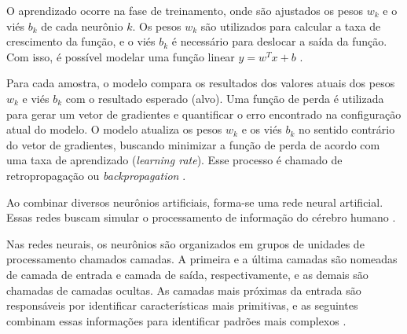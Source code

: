 O aprendizado ocorre na fase de treinamento, onde são ajustados os pesos $w_k$ e o viés $b_k$ de cada neurônio $k$. Os pesos $w_k$ são utilizados para calcular a taxa de crescimento da função, e o viés $b_k$ é necessário para deslocar a saída da função. Com isso, é possível modelar uma função linear $y = w^T x + b$ \cite{marti2017aprendizado}.

Para cada amostra, o modelo compara os resultados dos valores atuais dos pesos $w_k$ e viés $b_k$ com o resultado esperado (alvo). Uma função de perda é utilizada para gerar um vetor de gradientes e quantificar o erro encontrado na configuração atual do modelo. O modelo atualiza os pesos $w_k$ e os viés $b_k$ no sentido contrário do vetor de gradientes, buscando minimizar a função de perda de acordo com uma taxa de aprendizado (\textit{learning rate}). Esse processo é chamado de retropropagação ou \textit{backpropagation} \cite{marti2017aprendizado}.

Ao combinar diversos neurônios artificiais, forma-se uma rede neural artificial. Essas redes buscam simular o processamento de informação do cérebro humano \cite{ferneda2006redes}.

Nas redes neurais, os neurônios são organizados em grupos de unidades de processamento chamados camadas. A primeira e a última camadas são nomeadas de camada de entrada e camada de saída, respectivamente, e as demais são chamadas de camadas ocultas. As camadas mais próximas da entrada são responsáveis por identificar características mais primitivas, e as seguintes combinam essas informações para identificar padrões mais complexos \cite{marti2017aprendizado}.
